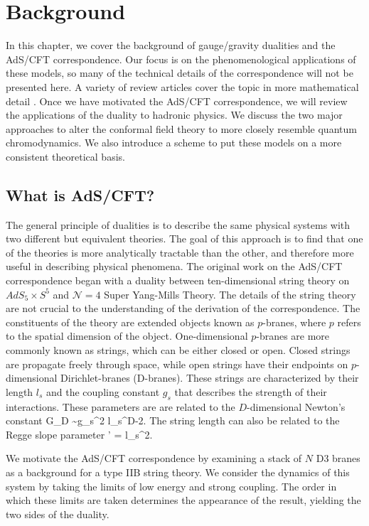 \chapter{Background}
\label{background}

In this chapter, we cover the background of gauge/gravity dualities and the AdS/CFT correspondence.
Our focus is on the phenomenological applications of these models, so many of the technical details of the correspondence will not be presented here.
A variety of review articles cover the topic in more mathematical detail \cite{Ramallo2013,Zaffaroni2000,Kim2012,Erdmenger:2007cm,FILL-IN}.
Once we have motivated the AdS/CFT correspondence, we will review the applications of the duality to hadronic physics. 
We discuss the two major approaches to alter the conformal field theory to more closely resemble quantum chromodynamics.
We also introduce a scheme to put these models on a more consistent theoretical basis.

\section{What is AdS/CFT?}
The general principle of dualities is to describe the same physical systems with two different but equivalent theories. 
The goal of this approach is to find that one of the theories is more analytically tractable than the other, and therefore more useful in describing physical phenomena.
The original work on the AdS/CFT correspondence began with a duality between ten-dimensional string theory on $AdS_5 \times S^5$ and $\mathcal{N}=4 $ Super Yang-Mills Theory.
The details of the string theory are not crucial to the understanding of the derivation of the correspondence.
The constituents of the theory are extended objects known as $p$-branes, where $p$ refers to the spatial dimension of the object. 
One-dimensional $p$-branes are more commonly known as strings, which can be either closed or open.
Closed strings are propagate freely through space, while open strings have  their endpoints on $p$-dimensional Dirichlet-branes (D-branes). 
These strings are characterized by their length $l_s$ and the coupling constant $g_s$ that describes the strength of their interactions. 
These parameters are are related to the $D$-dimensional Newton's constant
\be
G_D \sim g_s^2 l_s^{D-2}.
\ee
The string length can also be related to the Regge slope parameter
\be
\alpha' = l_s^2.
\label{eq:ReggeSlope}
\ee

We motivate the AdS/CFT correspondence by examining a stack of $N$ D3 branes as a background for a type IIB string theory.
We consider the dynamics of this system by taking the limits of low energy and strong coupling. 
The order in which these limits are taken determines the appearance of the result, yielding the two sides of the duality.

